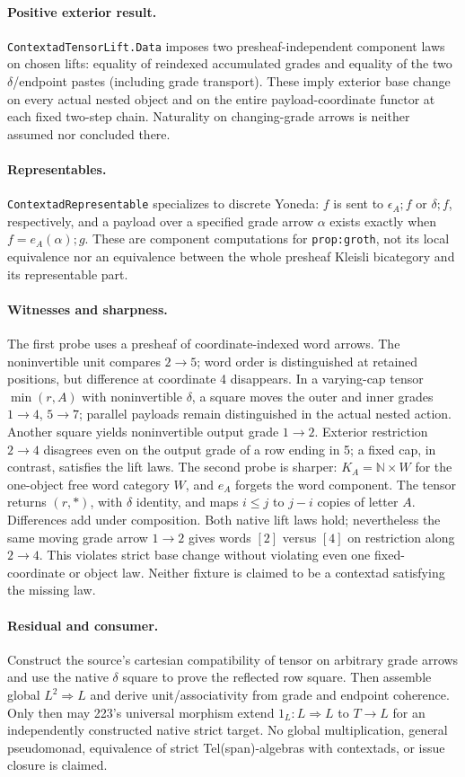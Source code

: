 \documentclass{article}
\begin{document}
\paragraph{Positive exterior result.} \texttt{ContextadTensorLift.Data}
imposes two presheaf-independent component laws on chosen lifts: equality
of reindexed accumulated grades and equality of the two $\delta$/endpoint
pastes (including grade transport). These imply exterior base change on
every actual nested object and on the entire payload-coordinate functor
at each fixed two-step chain. Naturality on changing-grade arrows is
neither assumed nor concluded there.
\paragraph{Representables.} \texttt{ContextadRepresentable} specializes
to discrete Yoneda: $f$ is sent to $\epsilon_A;f$ or $\delta;f$, respectively,
and a payload over a specified grade arrow $\alpha$ exists exactly when
$f=e_A(\alpha);g$. These are component computations for \texttt{prop:groth},
not its local equivalence nor an equivalence between the whole presheaf
Kleisli bicategory and its representable part.
\paragraph{Witnesses and sharpness.} The first probe uses a presheaf of
coordinate-indexed word arrows. The noninvertible unit compares $2\to5$;
word order is distinguished at retained positions, but difference at
coordinate 4 disappears. In a varying-cap tensor $\min(r,A)$ with
noninvertible $\delta$, a square moves the outer and inner grades
$1\to4$, $5\to7$; parallel payloads remain distinguished in the actual
nested action. Another square yields noninvertible output grade $1\to2$.
Exterior restriction $2\to4$ disagrees even on the output grade of a
row ending in 5; a fixed cap, in contrast, satisfies the lift laws.
The second probe is sharper: $K_A=\mathbb N\times W$ for the one-object
free word category $W$, and $e_A$ forgets the word component. The tensor
returns $(r,*)$, with $\delta$ identity, and maps $i\le j$ to $j-i$ copies
of letter $A$. Differences add under composition. Both native lift laws
hold; nevertheless the same moving grade arrow $1\to2$ gives words
$[2]$ versus $[4]$ on restriction along $2\to4$. This violates strict
base change without violating even one fixed-coordinate or object law.
Neither fixture is claimed to be a contextad satisfying the missing law.
\paragraph{Residual and consumer.} Construct the source's cartesian
compatibility of tensor on arbitrary grade arrows and use the native
$\delta$ square to prove the reflected row square. Then assemble global
$L^2\Rightarrow L$ and derive unit/associativity from grade and endpoint
coherence. Only then may 223's universal morphism extend $1_L:L\Rightarrow
L$ to $T\to L$ for an independently constructed native strict target.
No global multiplication, general pseudomonad, equivalence of strict
Tel(span)-algebras with contextads, or issue closure is claimed.
\end{document}

